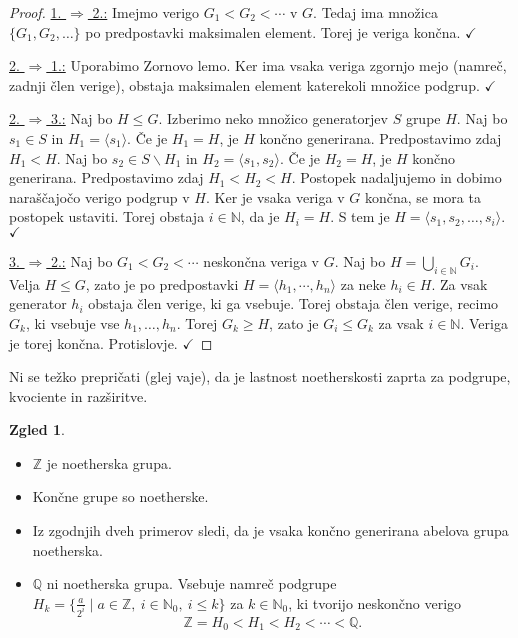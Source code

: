 \documentclass[11pt]{book}
\def\NN{\mathbb{N}}
\def\ZZ{\mathbb{Z}}
\def\QQ{\mathbb{Q}}
\def\literatura{\color{modra}}
\def\vaje{{\literatura (glej vaje)}}
\def\kljuka{$\checkmark$}
\theoremstyle{definition}
\theoremstyle{zgled}
\newtheorem*{zgled}{Zgled}
\theoremstyle{odprtproblem}
\theoremstyle{domacanaloga}
\newenvironment{dokaz}
    {\color{siva}\begin{proof}}
    {\end{proof}}
\theoremstyle{izrek}
\begin{document}
\begin{dokaz}
\underline{1. $\Rightarrow$ 2.:} Imejmo verigo $G_1 < G_2 < \cdots$ v $G$. Tedaj ima množica $\{ G_1, G_2, \dots \}$ po predpostavki maksimalen element. Torej je veriga končna. \kljuka

\underline{2. $\Rightarrow$ 1.:} Uporabimo Zornovo lemo. Ker ima vsaka veriga zgornjo mejo (namreč, zadnji člen verige), obstaja maksimalen element katerekoli množice podgrup. \kljuka

\underline{2. $\Rightarrow$ 3.:} Naj bo $H \leq G$. Izberimo neko množico generatorjev $S$ grupe $H$. Naj bo $s_1 \in S$ in $H_1 = \langle s_1 \rangle$. Če je $H_1 = H$, je $H$ končno generirana. Predpostavimo zdaj $H_1 < H$. Naj bo $s_2 \in S \backslash H_1$ in $H_2 = \langle s_1, s_2 \rangle$. Če je $H_2 = H$, je $H$ končno generirana. Predpostavimo zdaj $H_1 < H_2 < H$. Postopek nadaljujemo in dobimo naraščajočo verigo podgrup v $H$. Ker je vsaka veriga v $G$ končna, se mora ta postopek ustaviti. Torej obstaja $i \in \NN$, da je $H_i = H$. S tem je $H = \langle s_1, s_2, \dots, s_i \rangle$. \kljuka

\underline{3. $\Rightarrow$ 2.:} Naj bo $G_1 < G_2 < \cdots$ neskončna veriga v $G$. Naj bo $H = \bigcup_{i \in \NN} G_i$. Velja $H \leq G$, zato je po predpostavki $H = \langle h_1, \cdots, h_n \rangle$ za neke $h_i \in H$. Za vsak generator $h_i$ obstaja člen verige, ki ga vsebuje. Torej obstaja člen verige, recimo $G_k$, ki vsebuje vse $h_1, \dots, h_n$. Torej $G_k \geq H$, zato je $G_i \leq G_k$ za vsak $i \in \NN$. Veriga je torej končna. Protislovje. \kljuka 
\end{dokaz}

Ni se težko prepričati \vaje, da je lastnost noetherskosti zaprta za podgrupe, kvociente in razširitve.

\begin{zgled}
\begin{itemize}
    \item $\ZZ$ je noetherska grupa.
    \item Končne grupe so noetherske.
    \item Iz zgodnjih dveh primerov sledi, da je vsaka končno generirana abelova grupa noetherska.
    \item $\QQ$ ni noetherska grupa. Vsebuje namreč podgrupe $H_k = \{ \frac{a}{2^i} \mid a \in \ZZ, \ i \in \NN_0, \ i \leq k \}$ za $k \in \NN_0$, ki tvorijo neskončno verigo
    \[
    \ZZ = H_0 < H_1 < H_2 < \cdots < \QQ.
    \]
\end{itemize}
\end{zgled}
\end{document}
